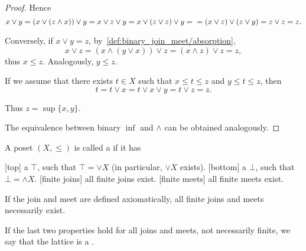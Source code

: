 \begin{proof}
  Hence
  \begin{equation*}
    x \lor y = (x \lor (z \land x)) \lor y = x \lor z \lor y = x \lor (z \lor z) \lor y = \\ = (x \lor z) \lor (z \lor y) = z \lor z = z.
  \end{equation*}

  Conversely, if \( x \lor y = z \), by~\ref{def:binary_join_meet/absorption},
  \begin{equation*}
    x \lor z = (x \land (y \lor x)) \lor z = (x \land z) \lor z = z,
  \end{equation*}
  thus \( x \leq z \). Analogously, \( y \leq z \).

  If we assume that there exists \( t \in X \) such that \( x \leq t \leq z \) and \( y \leq t \leq z \), then
  \begin{equation*}
    t = t \lor x = t \lor x \lor y = t \lor z = z.
  \end{equation*}

  Thus \( z = \sup \{ x, y \} \).

  The equivalence between binary \( \inf \) and \( \land \) can be obtained analogously.
\end{proof}

\begin{definition}\label{def:lattice}
  A poset \( (X, \leq) \) is called a  if it has
  \begin{description}
    [top] a  \( \top \), such that \( \top = \lor X \) (in particular, \( \lor X \) exists).
    [bottom] a  \( \bot \), such that \( \bot = \land X \).
    [finite joins] all finite joins exist.
    [finite meets] all finite meets exist.
  \end{description}

  If the join and meet are defined axiomatically, all finite joins and meets necessarily exist.

  If the last two properties hold for all joins and meets, not necessarily finite, we say that the lattice is a .
\end{definition}

